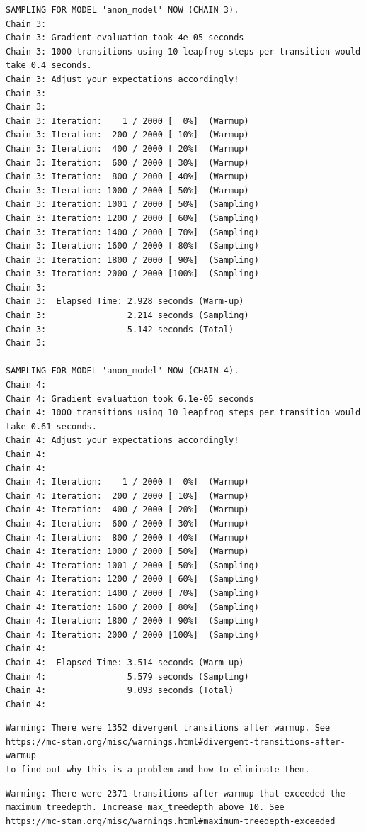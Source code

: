 \documentclass[
  10pt,
]{article}
\begin{document}
\begin{verbatim}
SAMPLING FOR MODEL 'anon_model' NOW (CHAIN 3).
Chain 3: 
Chain 3: Gradient evaluation took 4e-05 seconds
Chain 3: 1000 transitions using 10 leapfrog steps per transition would take 0.4 seconds.
Chain 3: Adjust your expectations accordingly!
Chain 3: 
Chain 3: 
Chain 3: Iteration:    1 / 2000 [  0%]  (Warmup)
Chain 3: Iteration:  200 / 2000 [ 10%]  (Warmup)
Chain 3: Iteration:  400 / 2000 [ 20%]  (Warmup)
Chain 3: Iteration:  600 / 2000 [ 30%]  (Warmup)
Chain 3: Iteration:  800 / 2000 [ 40%]  (Warmup)
Chain 3: Iteration: 1000 / 2000 [ 50%]  (Warmup)
Chain 3: Iteration: 1001 / 2000 [ 50%]  (Sampling)
Chain 3: Iteration: 1200 / 2000 [ 60%]  (Sampling)
Chain 3: Iteration: 1400 / 2000 [ 70%]  (Sampling)
Chain 3: Iteration: 1600 / 2000 [ 80%]  (Sampling)
Chain 3: Iteration: 1800 / 2000 [ 90%]  (Sampling)
Chain 3: Iteration: 2000 / 2000 [100%]  (Sampling)
Chain 3: 
Chain 3:  Elapsed Time: 2.928 seconds (Warm-up)
Chain 3:                2.214 seconds (Sampling)
Chain 3:                5.142 seconds (Total)
Chain 3: 

SAMPLING FOR MODEL 'anon_model' NOW (CHAIN 4).
Chain 4: 
Chain 4: Gradient evaluation took 6.1e-05 seconds
Chain 4: 1000 transitions using 10 leapfrog steps per transition would take 0.61 seconds.
Chain 4: Adjust your expectations accordingly!
Chain 4: 
Chain 4: 
Chain 4: Iteration:    1 / 2000 [  0%]  (Warmup)
Chain 4: Iteration:  200 / 2000 [ 10%]  (Warmup)
Chain 4: Iteration:  400 / 2000 [ 20%]  (Warmup)
Chain 4: Iteration:  600 / 2000 [ 30%]  (Warmup)
Chain 4: Iteration:  800 / 2000 [ 40%]  (Warmup)
Chain 4: Iteration: 1000 / 2000 [ 50%]  (Warmup)
Chain 4: Iteration: 1001 / 2000 [ 50%]  (Sampling)
Chain 4: Iteration: 1200 / 2000 [ 60%]  (Sampling)
Chain 4: Iteration: 1400 / 2000 [ 70%]  (Sampling)
Chain 4: Iteration: 1600 / 2000 [ 80%]  (Sampling)
Chain 4: Iteration: 1800 / 2000 [ 90%]  (Sampling)
Chain 4: Iteration: 2000 / 2000 [100%]  (Sampling)
Chain 4: 
Chain 4:  Elapsed Time: 3.514 seconds (Warm-up)
Chain 4:                5.579 seconds (Sampling)
Chain 4:                9.093 seconds (Total)
Chain 4: 
\end{verbatim}

\begin{verbatim}
Warning: There were 1352 divergent transitions after warmup. See
https://mc-stan.org/misc/warnings.html#divergent-transitions-after-warmup
to find out why this is a problem and how to eliminate them.
\end{verbatim}

\begin{verbatim}
Warning: There were 2371 transitions after warmup that exceeded the maximum treedepth. Increase max_treedepth above 10. See
https://mc-stan.org/misc/warnings.html#maximum-treedepth-exceeded
\end{verbatim}
\end{document}

